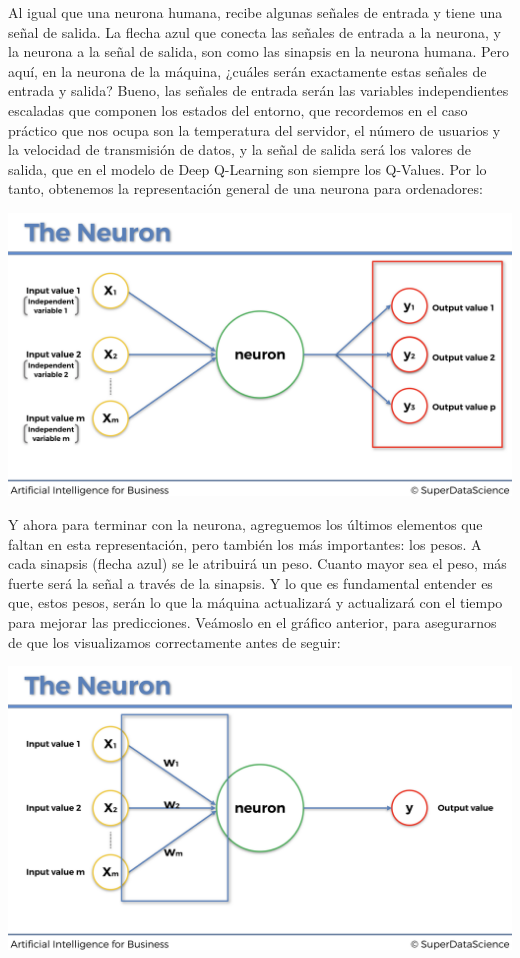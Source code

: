 \documentclass[]{book}
\begin{document}
Al igual que una neurona humana, recibe algunas señales de entrada y tiene una señal de salida. La flecha azul que conecta las señales de entrada a la neurona, y la neurona a la señal de salida, son como las sinapsis en la neurona humana. Pero aquí, en la neurona de la máquina, ¿cuáles serán exactamente estas señales de entrada y salida? Bueno, las señales de entrada serán las variables independientes escaladas que componen los estados del entorno, que recordemos en el caso práctico que nos ocupa son la temperatura del servidor, el número de usuarios y la velocidad de transmisión de datos, y la señal de salida será los valores de salida, que en el modelo de Deep Q-Learning son siempre los Q-Values. Por lo tanto, obtenemos la representación general de una neurona para ordenadores:

\includegraphics{Images/ANN_7.png}

Y ahora para terminar con la neurona, agreguemos los últimos elementos que faltan en esta representación, pero también los más importantes: los pesos. A cada sinapsis (flecha azul) se le atribuirá un peso. Cuanto mayor sea el peso, más fuerte será la señal a través de la sinapsis. Y lo que es fundamental entender es que, estos pesos, serán lo que la máquina actualizará y actualizará con el tiempo para mejorar las predicciones. Veámoslo en el gráfico anterior, para asegurarnos de que los visualizamos correctamente antes de seguir:

\includegraphics{Images/ANN_8.png}
\end{document}
